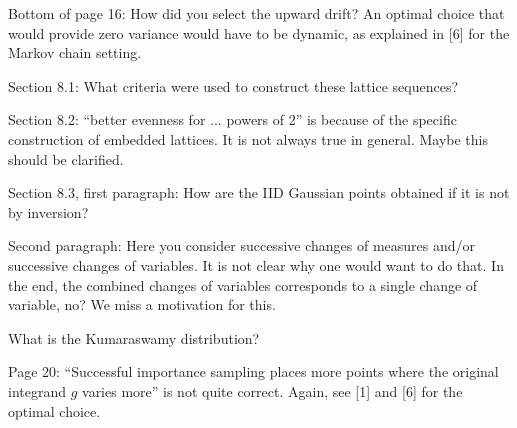 \documentclass{amsart}
\begin{document}
Bottom of page 16: How did you select the upward drift? An optimal choice that would provide zero variance would have to be dynamic, as explained in [6] for the Markov chain
setting.


\vspace{1cm}

Section 8.1: What criteria were used to construct these lattice sequences?

\vspace{1cm}

Section 8.2: “better evenness for ... powers of 2” is because of the specific construction of embedded lattices. It is not always true in general. Maybe this should be clarified.

\vspace{1cm}

Section 8.3, first paragraph: How are the IID Gaussian points obtained if it is not by inversion?

\vspace{1cm}

Second paragraph: Here you consider successive changes of measures and/or successive changes of variables. It is not clear why one would want to do that. In the end, the combined changes of variables corresponds to a single change of variable, no? We miss a motivation for this.

\vspace{1cm}

What is the Kumaraswamy distribution?

\vspace{1cm}

Page 20: ``Successful importance sampling places more points where the original integrand $g$ varies more'' is not quite correct. Again, see [1] and [6] for the optimal choice.
\end{document}
